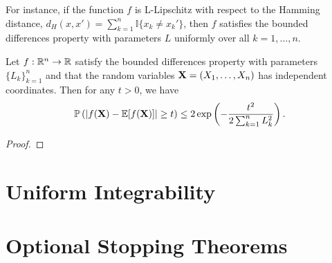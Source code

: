 For instance, if the function \(f\) is L-Lipschitz with respect to the Hamming distance, \(d_{H}(x,x')=\sum_{k=1}^{n}\mathbb{I}\{x_{k}\neq x_{k}'\}\), then  \(f\) satisfies the bounded differences property with parameters \(L\) uniformly over all \(k=1,\ldots,n\).

\begin{theorem}
	\label{thm:bounded-differences}
	Let \(f:{\mathbb R}^{n}\to{\mathbb R}\) satisfy the bounded differences property with parameters \(\{L_{k}\}_{k=1}^{n}\) and that the random variables \({\bf X}=(X_{1},\ldots,X_{n})\) has independent coordinates. Then for any \(t>0\), we have
	\begin{equation*}
		{\mathbb P}\left(\left|f({\bf X})-{\mathbb E}[f({\bf X})]\right|\geq t\right)\leq 2\exp\left(-\frac{t^{2}}{2\sum_{k=1}^{n}L_{k}^{2}}\right).
	\end{equation*}
\end{theorem}
\begin{proof}
	
\end{proof}

\begin{example}
	
\end{example}

\begin{example}[U-statistics]
	
\end{example}

\begin{example}
	
\end{example}

\begin{theorem}

\end{theorem}

\begin{theorem}

\end{theorem}

\section{Uniform Integrability}

\section{Optional Stopping Theorems}
